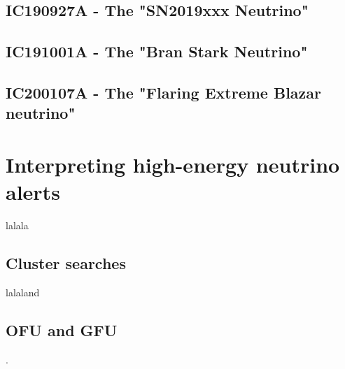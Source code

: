 \subsection{IC190927A - The "SN2019xxx Neutrino"}

\subsection{IC191001A - The "Bran Stark Neutrino"}

\subsection{IC200107A - The "Flaring Extreme Blazar neutrino"}

\section{Interpreting high-energy neutrino alerts}

lalala

\subsection{Cluster searches}
lalaland

\subsection{OFU and GFU}.